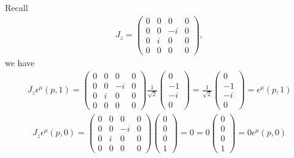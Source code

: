\documentclass[11pt]{article}
\begin{document}
\section{ }
Recall
\begin{eqnarray}
J_z=
\begin{pmatrix}
0 & 0 & 0 & 0 \\
0 & 0 & -i & 0 \\
0 & i & 0 & 0 \\
0 & 0 & 0 & 0 
\end{pmatrix},
\end{eqnarray}
we have
\begin{eqnarray}
    J_z \epsilon^\mu(p,1)= 
    \begin{pmatrix}
        0 & 0 & 0 & 0 \\
        0 & 0 & -i & 0 \\
        0 & i & 0 & 0 \\
        0 & 0 & 0 & 0 
        \end{pmatrix}
        \frac{1}{\sqrt 2}
    \begin{pmatrix}
        0 \\ -1 \\ -i \\ 0
    \end{pmatrix}
    =\frac{1}{\sqrt 2}
    \begin{pmatrix}
        0 \\ -1 \\ -i \\ 0
    \end{pmatrix}
    =\epsilon^\mu(p,1)
\end{eqnarray}
\begin{eqnarray}
    J_z \epsilon^\mu(p,0)= 
    \begin{pmatrix}
        0 & 0 & 0 & 0 \\
        0 & 0 & -i & 0 \\
        0 & i & 0 & 0 \\
        0 & 0 & 0 & 0 
        \end{pmatrix}
    \begin{pmatrix}
        0 \\ 0 \\ 0 \\ 1
    \end{pmatrix}
    =0=0
    \begin{pmatrix}
        0 \\ 0 \\ 0 \\ 1
    \end{pmatrix}
    =0\epsilon^\mu(p,0)
\end{eqnarray}
\end{document}
